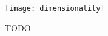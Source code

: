 \begin{figure}
\begin{center}

\texttt{[image: dimensionality]}
\caption{
TODO
}
\label{fig:dimensionality}

\end{center}
\end{figure}
